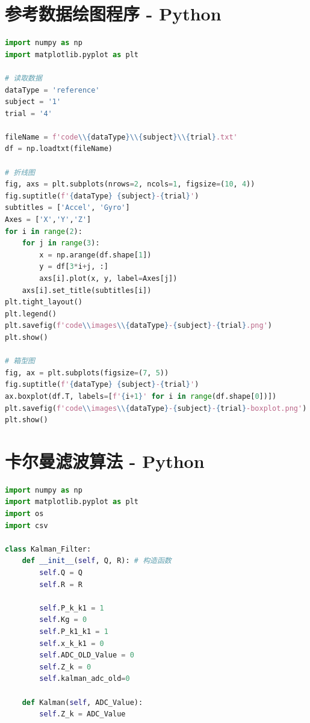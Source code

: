 \documentclass[withoutpreface]{cumcmthesis}
\begin{document}
\begin{appendices}
\section{参考数据绘图程序 - Python}

\begin{lstlisting}[language=python]
import numpy as np
import matplotlib.pyplot as plt

# 读取数据
dataType = 'reference'
subject = '1'
trial = '4'

fileName = f'code\\{dataType}\\{subject}\\{trial}.txt'
df = np.loadtxt(fileName)

# 折线图
fig, axs = plt.subplots(nrows=2, ncols=1, figsize=(10, 4))
fig.suptitle(f'{dataType} {subject}-{trial}')
subtitles = ['Accel', 'Gyro']
Axes = ['X','Y','Z']
for i in range(2):
    for j in range(3):
        x = np.arange(df.shape[1])
        y = df[3*i+j, :]
        axs[i].plot(x, y, label=Axes[j])
    axs[i].set_title(subtitles[i])
plt.tight_layout()
plt.legend()
plt.savefig(f'code\\images\\{dataType}-{subject}-{trial}.png')
plt.show()

# 箱型图
fig, ax = plt.subplots(figsize=(7, 5))
fig.suptitle(f'{dataType} {subject}-{trial}')
ax.boxplot(df.T, labels=[f'{i+1}' for i in range(df.shape[0])])
plt.savefig(f'code\\images\\{dataType}-{subject}-{trial}-boxplot.png')
plt.show()
\end{lstlisting}

\section{卡尔曼滤波算法 - Python}

\begin{lstlisting}[language=python]
import numpy as np
import matplotlib.pyplot as plt
import os
import csv

class Kalman_Filter:
    def __init__(self, Q, R): # 构造函数
        self.Q = Q
        self.R = R

        self.P_k_k1 = 1
        self.Kg = 0
        self.P_k1_k1 = 1
        self.x_k_k1 = 0
        self.ADC_OLD_Value = 0
        self.Z_k = 0
        self.kalman_adc_old=0

    def Kalman(self, ADC_Value):
        self.Z_k = ADC_Value


\end{lstlisting}
\end{appendices}
\end{document}
